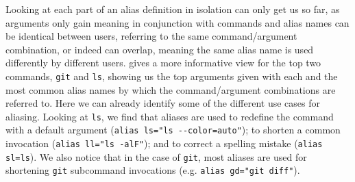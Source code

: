 Looking at each part of an alias definition in isolation can only get us so far, as arguments only gain meaning in conjunction with commands and alias names can be identical between users, referring to the same command/argument combination, or indeed can overlap, meaning the same alias name is used differently by different users.
 gives a more informative view for the top two commands, \texttt{git} and \texttt{ls}, showing us the top arguments given with each and the most common alias names by which the command/argument combinations are referred to.
Here we can already identify some of the different use cases for aliasing.
Looking at \texttt{ls}, we find that aliases are used 
to redefine the command with a default argument (\verb|alias ls="ls --color=auto"|);
to shorten a common invocation (\verb|alias ll="ls -alF"|);
and to correct a spelling mistake (\verb|alias sl=ls|).
We also notice that in the case of \texttt{git}, most aliases are used for shortening \texttt{git} subcommand invocations (e.g. \verb|alias gd="git diff"|).

\newcommand{\numx}[1]{{\small (\num{#1})}}


